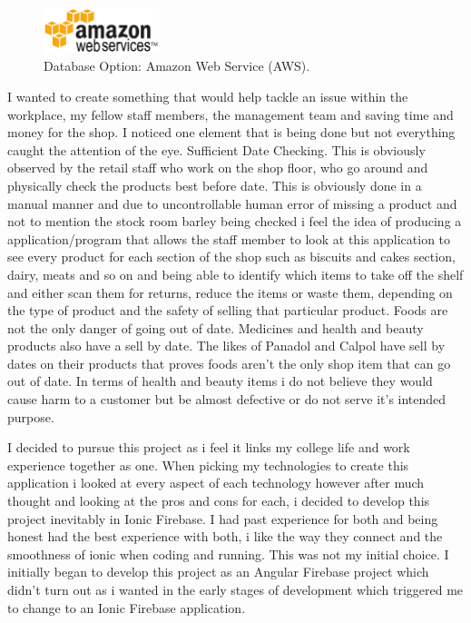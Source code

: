 \begin{figure}[h!]
	\caption{Database Option: Amazon Web Service (AWS).}
	\label{image:aws}
	\centering
	\includegraphics[width=0.3\textwidth]{images/aws.png}
\end{figure}


I wanted to create something that would help tackle an issue within the workplace, my fellow staff members, the management team and saving time and money for the shop. I noticed one element that is being done but not everything caught the attention of the eye. Sufficient Date Checking. This is obviously observed by the retail staff who work on the shop floor, who go around and physically check the products best before date.  This is obviously done in a manual manner and due to uncontrollable human error of missing a product and not to mention the stock room barley being checked i feel  the idea of producing a application/program that allows the staff member to look at this application to see every product for each section of the shop such as biscuits and cakes section, dairy, meats and so on and being able to identify which items to take off the shelf and either scan them for returns, reduce the items or waste them, depending on the type of product and the safety of selling that particular product. Foods are not the only danger of going out of date. Medicines and health and beauty products also have a sell by date. The likes of Panadol and Calpol have sell by dates on their products that proves foods aren't the only shop item that can go out of date. In terms of health and beauty items i do not believe they would cause harm to a customer but be almost defective or do not serve it's intended purpose. 
\newline

I decided to pursue this project as i feel it links my college life and work experience together as one. When picking my technologies to create this application i looked at every aspect of each technology however after much thought and looking at the pros and cons for each, i decided to develop this project inevitably in Ionic Firebase. I had past experience for both and being honest had the best experience with both, i like the way they connect and the smoothness of ionic when coding and running. This was not my initial choice. I initially began to develop this project as an Angular Firebase project which didn't turn out as i wanted in the early stages of development which triggered me to change to an Ionic Firebase application.

